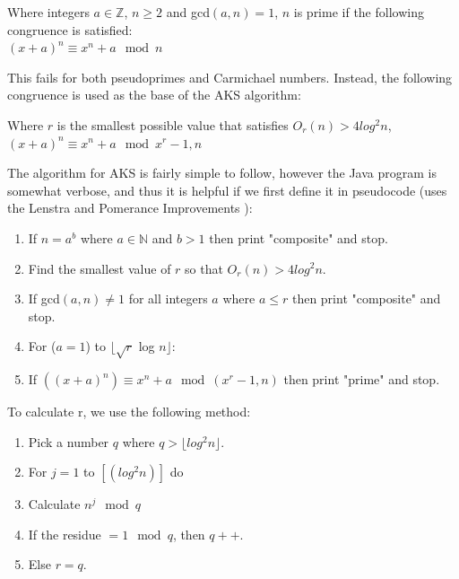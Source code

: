     \begin{mathfact}
      Where integers $a \in \mathbb{Z}$, $n \geq 2$ and gcd$(a,n)=1$, $n$ is prime if the following congruence is satisfied: \\
      $(x+a)^n \equiv x^n + a \mod{n}$ 
    \end{mathfact}
    
    This fails for both pseudoprimes and Carmichael numbers. Instead, the following congruence is used as the base of the AKS algorithm: 
    
    \begin{mathdef}
      Where $r$ is the smallest possible value that satisfies $O_r(n) > 4log^2n$,\\
       $(x+a)^n \equiv x^n + a \mod{x^r -1, n}$ 
    \end{mathdef}
    
    The algorithm for AKS is fairly simple to follow, however the Java program is somewhat verbose, and thus it is helpful if we first define it in pseudocode (uses the Lenstra and Pomerance Improvements \cite{Salembier:2005aa}):
    
    \begin{enumerate}
      \item If $n = a^b$ where $a \in \mathbb{N}$ and $b > 1$ then print "composite" and stop.
      \item Find the smallest value of $r$ so that $O_r(n) > 4log^2n$.
      \item If gcd$(a,n) \neq 1$ for all integers $a$ where $a \leq r$ then print "composite" and stop.
      \item For ($a=1$) to $\lfloor \sqrt{r} $ log $ n \rfloor$:
      \item If $((x+a)^n) \equiv x^n + a \mod{(x^r-1, n)}$ then print "prime" and stop.
    \end{enumerate}
    
    To calculate r, we use the following method:
    
    \begin{enumerate}
      \item Pick a number $q$ where $q > \lfloor log^2n \rfloor$.
      \item For $j=1$ to $[(log^2n)]$ do
      \item   Calculate $n^j \mod{q}$
      \item   If the residue $= 1 \mod{q}$, then $q++$.
      \item   Else $r=q$.
    \end{enumerate}
    
